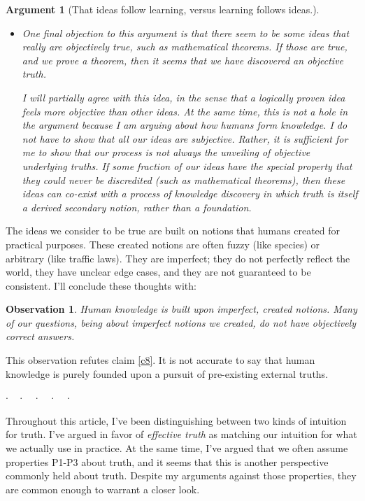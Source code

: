 \documentclass[11pt, oneside]{article}   	%
\newtheorem{obs}{Observation}
\newtheorem{argt}{Argument}
\newcommand{\dotq}{\cdot\quad}
\newcommand{\scenebreak}{
    \medskip\centerline{$\dotq\dotq\dotq\dotq\cdot$}\medskip
}
\begin{document}
\begin{argt}[That ideas follow learning, versus learning follows ideas.]
\begin{itemize}
    \item{}
        One final objection to this argument is that there seem to be some ideas
        that really are objectively true, such as mathematical theorems. If
        those are true, and we prove a theorem, then it seems that we have
        discovered an objective truth.

        I will partially agree with this idea, in the sense that a logically
        proven idea feels more objective than other ideas. At the same time,
        this is not a hole in the argument because I am arguing about how humans
        form knowledge. I do not have to show that all our ideas are subjective.
        Rather, it is sufficient for me to show that our process is not always
        the unveiling of objective underlying truths. If some fraction of our
        ideas have the special property that they could never be discredited
        (such as mathematical theorems),
        then these ideas can co-exist
        with a process of knowledge discovery in which
        truth is itself a derived secondary notion, rather than a foundation.
\end{itemize}
\end{argt}

The ideas we consider to be true are built on notions that humans
created for practical purposes.
These created notions are often fuzzy (like species)
or arbitrary (like traffic laws). They are imperfect; they do not
perfectly reflect the world, they have unclear edge cases, and they are not
guaranteed to be consistent.
I'll conclude these thoughts with:
\begin{obs}\label{o9}
Human knowledge is
built upon imperfect, created notions.
Many of our questions, being about imperfect
notions we created, do not have objectively
correct answers.
\end{obs}

This observation refutes claim \ref{c8}.
It is not accurate to say that human knowledge is purely founded upon a
pursuit of pre-existing external truths.

\scenebreak

Throughout this article, I've been distinguishing between two kinds of intuition
for truth.
I've argued in favor of {\em effective truth} as matching our intuition for what
we actually use in practice. %
At the same time, I've argued that we often assume properties P1-P3 about truth,
and it seems that this is another perspective commonly held about truth.
Despite my arguments against those properties, they are common enough to warrant
a closer look.
\end{document}
